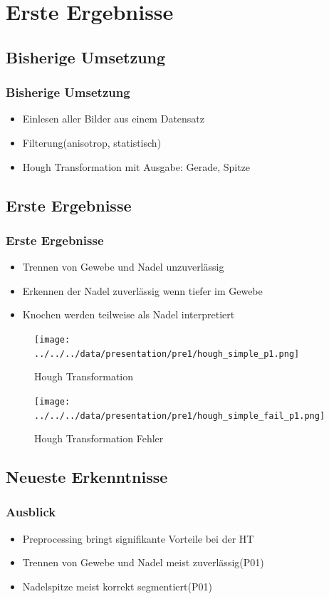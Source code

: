\documentclass[11pt]{beamer}
\begin{document}
\section{Erste Ergebnisse}
\subsection{Bisherige Umsetzung}
\begin{frame}
\frametitle{Bisherige Umsetzung}
\begin{itemize}
\item Einlesen aller Bilder aus einem Datensatz
\item Filterung(anisotrop, statistisch)
\item Hough Transformation mit Ausgabe: Gerade, Spitze
\end{itemize}
\end{frame}

\subsection{Erste Ergebnisse}
\begin{frame}[allowframebreaks]
\frametitle{Erste Ergebnisse}
\begin{itemize}
\item Trennen von Gewebe und Nadel unzuverlässig
\item Erkennen der Nadel zuverlässig wenn tiefer im Gewebe
\item Knochen werden teilweise als Nadel interpretiert
\end{itemize}


\framebreak
\begin{figure}[H]
\centering
\texttt{[image: ../../../data/presentation/pre1/hough\_simple\_p1.png]}
\caption{Hough Transformation}
\end{figure}

\framebreak
\begin{figure}[H]
\centering
\texttt{[image: ../../../data/presentation/pre1/hough\_simple\_fail\_p1.png]}
\caption{Hough Transformation Fehler}
\end{figure}

\end{frame}

\subsection{Neueste Erkenntnisse}
\begin{frame}
\frametitle{Ausblick}
\begin{itemize}
\item Preprocessing bringt signifikante Vorteile bei der HT
\item Trennen von Gewebe und Nadel meist zuverlässig(P01)
\item Nadelspitze meist korrekt segmentiert(P01)
\end{itemize}
\end{frame}
\end{document}
